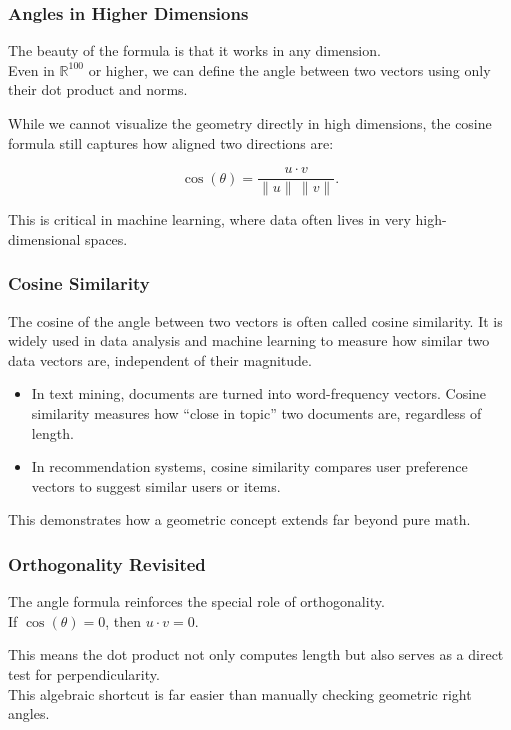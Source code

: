 \documentclass[
  letterpaper,
  DIV=11,
  numbers=noendperiod]{scrreprt}
\providecommand{\tightlist}{%
  \setlength{\itemsep}{0pt}\setlength{\parskip}{0pt}}
\begin{document}
\subsubsection{Angles in Higher
Dimensions}\label{angles-in-higher-dimensions}

The beauty of the formula is that it works in any dimension.\\
Even in \(\mathbb{R}^{100}\) or higher, we can define the angle between
two vectors using only their dot product and norms.

While we cannot visualize the geometry directly in high dimensions, the
cosine formula still captures how aligned two directions are:

\[
\cos(\theta) = \frac{u \cdot v}{\|u\| \, \|v\|}.
\]

This is critical in machine learning, where data often lives in very
high-dimensional spaces.

\subsubsection{Cosine Similarity}\label{cosine-similarity}

The cosine of the angle between two vectors is often called cosine
similarity. It is widely used in data analysis and machine learning to
measure how similar two data vectors are, independent of their
magnitude.

\begin{itemize}
\tightlist
\item
  In text mining, documents are turned into word-frequency vectors.
  Cosine similarity measures how ``close in topic'' two documents are,
  regardless of length.
\item
  In recommendation systems, cosine similarity compares user preference
  vectors to suggest similar users or items.
\end{itemize}

This demonstrates how a geometric concept extends far beyond pure math.

\subsubsection{Orthogonality Revisited}\label{orthogonality-revisited}

The angle formula reinforces the special role of orthogonality.\\
If \(\cos(\theta) = 0\), then \(u \cdot v = 0\).

This means the dot product not only computes length but also serves as a
direct test for perpendicularity.\\
This algebraic shortcut is far easier than manually checking geometric
right angles.
\end{document}
